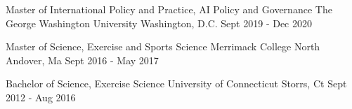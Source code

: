 

\begin{cventries}

  \cventry
    {Master of International Policy and Practice, AI Policy and Governance} %
    {The George Washington University} %
    {Washington, D.C.} %
    {Sept 2019 - Dec 2020} %
    {
      \begin{cvitems} %
      \end{cvitems}
    }
    
  \cventry
    {Master of Science, Exercise and Sports Science} %
    {Merrimack College} %
    {North Andover, Ma} %
    {Sept 2016 - May 2017} %
    {
      \begin{cvitems} %
      \end{cvitems}
    }
    
  \cventry
    {Bachelor of Science, Exercise Science} %
    {University of Connecticut} %
    {Storrs, Ct} %
    {Sept 2012 - Aug 2016} %
    {
      \begin{cvitems} %
      \end{cvitems}
    }
\end{cventries}
